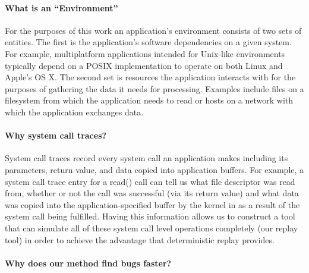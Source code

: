 
\paragraph{What is an ``Environment''}

For the purposes of this work an application's environment consists of two sets of entities.  The first is the
application's software dependencies on a given system.  For example, multiplatform applications intended for Unix-like
environments typically depend on a POSIX implementation to operate on both Linux and Apple's OS X.  The second set is
resources the application interacts with for the purposes of gathering the data it needs for processing.  Examples
include files on a filesystem from which the application needs to read or hosts on a network with which the application
exchanges data.


\paragraph{Why system call traces?}

System call traces record every system call an application makes including its parameters, return value, and data copied
into application buffers.  For example, a system call trace entry for a read() call can tell us what file descriptor was
read from, whether or not the call was successful (via its return value) and what data was copied into the
application-specified buffer by the kernel in as a result of the system call being fulfilled.  Having this information
allows us to construct a tool that can simulate all of these system call level operations completely (our replay tool)
in order to achieve the advantage that deterministic replay provides.

\paragraph{Why does our method find bugs faster?}

